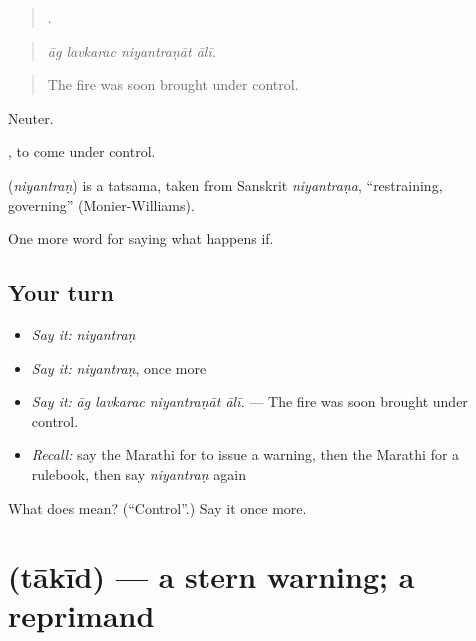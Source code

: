 \begin{quote}
   .
\end{quote}

\begin{quote}
\emph{āg lavkarac niyantraṇāt ālī.}
\end{quote}

\begin{quote}
The fire was soon brought under control.
\end{quote}

Neuter.

 , to come under control.

\begin{cousinweb}
\textbf{} (\emph{niyantraṇ}) is a tatsama, taken from Sanskrit \emph{niyantraṇa}, \textquotedblleft{}restraining, governing\textquotedblright{} (Monier-Williams).
\end{cousinweb}

\begin{grammarlens}[title={What you've built}]
One more word for saying what happens if.
\end{grammarlens}

\subsection*{Your turn}
\begin{itemize}
\raggedright
  \item \emph{Say it:} \emph{niyantraṇ}
  \item \emph{Say it:} \emph{niyantraṇ}, once more
  \item \emph{Say it:} \emph{āg lavkarac niyantraṇāt ālī.} — The fire was soon brought under control.
  \item \emph{Recall:} say the Marathi for to issue a warning, then the Marathi for a rulebook, then say \emph{niyantraṇ} again
\end{itemize}

\begin{tcolorbox}[breakable,colback=teal!4,colframe=teal!35!black,title={Before you move on}]
What does  mean? (\textquotedblleft{}Control\textquotedblright{}.) Say it once more.
\end{tcolorbox}
\section[\texorpdfstring{\mr{ताकीद} (tākīd)}{ताकीद (tākīd)}]{ (tākīd) — a stern warning; a reprimand}

